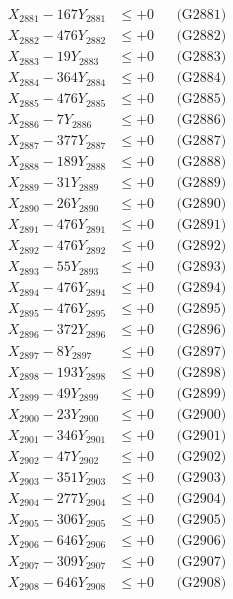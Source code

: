 \documentclass[a4paper,10pt]{article}
\begin{document}
{\begin{align}
\allowbreak
X_{2881} - 167Y_{2881} &\leq +0 && \text{(G2881)} \\
X_{2882} - 476Y_{2882} &\leq +0 && \text{(G2882)} \\
X_{2883} - 19Y_{2883} &\leq +0 && \text{(G2883)} \\
X_{2884} - 364Y_{2884} &\leq +0 && \text{(G2884)} \\
X_{2885} - 476Y_{2885} &\leq +0 && \text{(G2885)} \\
X_{2886} - 7Y_{2886} &\leq +0 && \text{(G2886)} \\
X_{2887} - 377Y_{2887} &\leq +0 && \text{(G2887)} \\
X_{2888} - 189Y_{2888} &\leq +0 && \text{(G2888)} \\
X_{2889} - 31Y_{2889} &\leq +0 && \text{(G2889)} \\
X_{2890} - 26Y_{2890} &\leq +0 && \text{(G2890)} \\
\allowbreak
X_{2891} - 476Y_{2891} &\leq +0 && \text{(G2891)} \\
X_{2892} - 476Y_{2892} &\leq +0 && \text{(G2892)} \\
X_{2893} - 55Y_{2893} &\leq +0 && \text{(G2893)} \\
X_{2894} - 476Y_{2894} &\leq +0 && \text{(G2894)} \\
X_{2895} - 476Y_{2895} &\leq +0 && \text{(G2895)} \\
X_{2896} - 372Y_{2896} &\leq +0 && \text{(G2896)} \\
X_{2897} - 8Y_{2897} &\leq +0 && \text{(G2897)} \\
X_{2898} - 193Y_{2898} &\leq +0 && \text{(G2898)} \\
X_{2899} - 49Y_{2899} &\leq +0 && \text{(G2899)} \\
X_{2900} - 23Y_{2900} &\leq +0 && \text{(G2900)} \\
\allowbreak
X_{2901} - 346Y_{2901} &\leq +0 && \text{(G2901)} \\
X_{2902} - 47Y_{2902} &\leq +0 && \text{(G2902)} \\
X_{2903} - 351Y_{2903} &\leq +0 && \text{(G2903)} \\
X_{2904} - 277Y_{2904} &\leq +0 && \text{(G2904)} \\
X_{2905} - 306Y_{2905} &\leq +0 && \text{(G2905)} \\
X_{2906} - 646Y_{2906} &\leq +0 && \text{(G2906)} \\
X_{2907} - 309Y_{2907} &\leq +0 && \text{(G2907)} \\
X_{2908} - 646Y_{2908} &\leq +0 && \text{(G2908)} \\

\end{align}}
\end{document}
